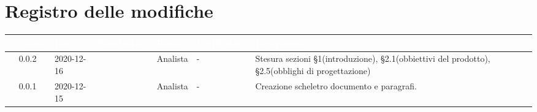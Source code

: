 \section*{Registro delle modifiche}
{
\renewcommand{\arraystretch}{1.5}
\centering
\begin{longtable}{c C{2.6cm} C{2.6cm} C{2.6cm} C{2.6cm} C{3.5cm}}
\textcolor{white}{\textbf{Versione}}&
\textcolor{white}{\textbf{Data}}&
\textcolor{white}{\textbf{Nominativo}}&
\textcolor{white}{\textbf{Ruolo}}&
\textcolor{white}{\textbf{Verificatore}}&
\textcolor{white}{\textbf{Descrizione}}\\	
\endhead
		
0.0.2 & 2020-12-16 & \SP{} & Analista & - & Stesura sezioni §1(introduzione), §2.1(obbiettivi del prodotto), §2.5(obblighi di progettazione)  \\
0.0.1 & 2020-12-15 & \SP{} & Analista & - & Creazione scheletro documento e paragrafi. \\
		
\end{longtable}
}

